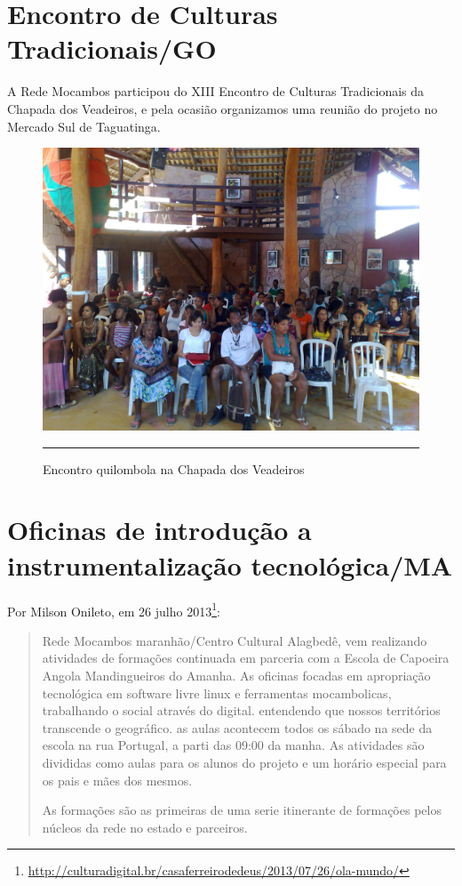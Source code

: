 \documentclass[a4paper, 11pt, oneside]{Relatorio_sem}  %
\begin{document}
\section{Encontro de Culturas Tradicionais/GO}
A Rede Mocambos participou do XIII Encontro de Culturas Tradicionais
da Chapada dos Veadeiros, e pela ocasião organizamos uma reunião do
projeto no Mercado Sul de Taguatinga.

\begin{figure}[htbp]
  \centering
  \includegraphics[width=\textwidth]{./Fig/Rota_Kalungas_1.pdf}
  \rule{35em}{0.5pt}
  \caption[Encontro quilombola na Chapada dos Veadeiros]{Encontro quilombola na Chapada dos Veadeiros}
  \label{fig:EncontroKalungas}
\end{figure}

\section{Oficinas de introdução a instrumentalização tecnológica/MA}
Por Milson Onileto, em 26 julho
2013\footnote{\url{http://culturadigital.br/casaferreirodedeus/2013/07/26/ola-mundo/}}:
\begin{quote}
  Rede Mocambos maranhão/Centro Cultural Alagbedê, vem realizando
  atividades de formações continuada em parceria com a Escola de
  Capoeira Angola Mandingueiros do Amanha.  As oficinas focadas em
  apropriação tecnológica em software livre linux e ferramentas
  mocambolicas, trabalhando o social através do digital. entendendo
  que nossos territórios transcende o geográfico. as aulas acontecem
  todos os sábado na sede da escola na rua Portugal, a parti das 09:00
  da manha.  As atividades são divididas como aulas para os alunos do
  projeto e um horário especial para os pais e mães dos mesmos.
  
  As formações são as primeiras de uma serie itinerante de formações
  pelos núcleos da rede no estado e parceiros.
\end{quote}
\end{document}
